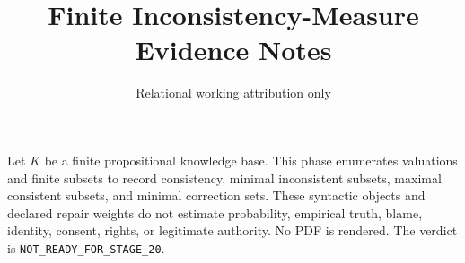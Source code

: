 \documentclass{article}
\title{Finite Inconsistency-Measure Evidence Notes}
\author{Relational working attribution only}
\begin{document}
\maketitle
Let $K$ be a finite propositional knowledge base. This phase enumerates valuations and finite subsets to record consistency, minimal inconsistent subsets, maximal consistent subsets, and minimal correction sets. These syntactic objects and declared repair weights do not estimate probability, empirical truth, blame, identity, consent, rights, or legitimate authority. No PDF is rendered. The verdict is \texttt{NOT\_READY\_FOR\_STAGE\_20}.
\end{document}
